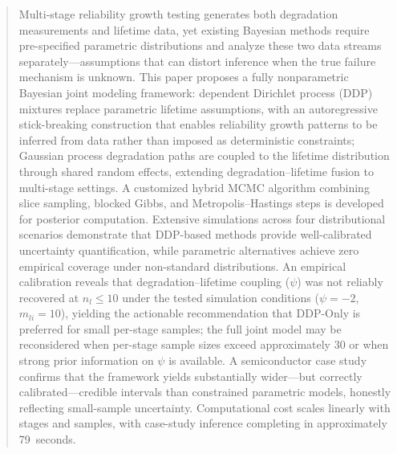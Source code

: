 \documentclass[a4paper,fleqn,longmktitle]{cas-sc}
\begin{document}
\begin{abstract}
Multi-stage reliability growth testing generates both degradation measurements and lifetime data, yet existing Bayesian methods require pre-specified parametric distributions and analyze these two data streams separately---assumptions that can distort inference when the true failure mechanism is unknown. This paper proposes a fully nonparametric Bayesian joint modeling framework: dependent Dirichlet process (DDP) mixtures replace parametric lifetime assumptions, with an autoregressive stick-breaking construction that enables reliability growth patterns to be inferred from data rather than imposed as deterministic constraints; Gaussian process degradation paths are coupled to the lifetime distribution through shared random effects, extending degradation--lifetime fusion to multi-stage settings. A customized hybrid MCMC algorithm combining slice sampling, blocked Gibbs, and Metropolis--Hastings steps is developed for posterior computation. Extensive simulations across four distributional scenarios demonstrate that DDP-based methods provide well-calibrated uncertainty quantification, while parametric alternatives achieve zero empirical coverage under non-standard distributions. An empirical calibration reveals that degradation--lifetime coupling ($\psi$) was not reliably recovered at $n_l \leq 10$ under the tested simulation conditions ($\psi=-2$, $m_{li}=10$), yielding the actionable recommendation that DDP-Only is preferred for small per-stage samples; the full joint model may be reconsidered when per-stage sample sizes exceed approximately 30 or when strong prior information on $\psi$ is available. A semiconductor case study confirms that the framework yields substantially wider---but correctly calibrated---credible intervals than constrained parametric models, honestly reflecting small-sample uncertainty. Computational cost scales linearly with stages and samples, with case-study inference completing in approximately 79~seconds.
\end{abstract}
\end{document}
